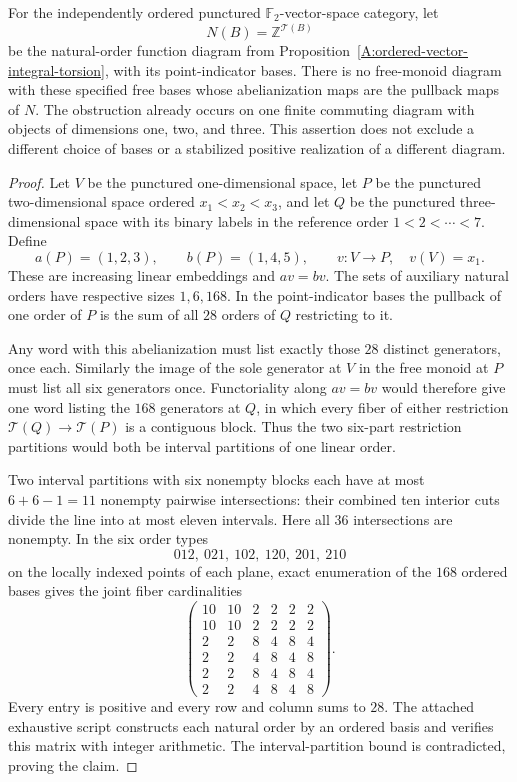 \begin{proposition}
\label{G:natural-order-fiber-obstruction}
For the independently ordered punctured $\mathbb F_2$-vector-space
category, let
\[
 N(B)=\mathbb Z^{\mathcal T(B)}
\]
be the natural-order function diagram from
Proposition~\ref{A:ordered-vector-integral-torsion}, with its
point-indicator bases. There is no free-monoid diagram with these
specified free bases whose abelianization maps are the pullback
maps of $N$. The obstruction already occurs on one finite
commuting diagram with objects of dimensions one, two, and three.
This assertion does not exclude a different choice of bases or a
stabilized positive realization of a different diagram.
\end{proposition}
\begin{proof}
Let $V$ be the punctured one-dimensional space, let $P$ be the
punctured two-dimensional space ordered $x_1<x_2<x_3$, and let
$Q$ be the punctured three-dimensional space with its binary labels
in the reference order $1<2<\cdots<7$. Define
\[
 a(P)=(1,2,3),\qquad b(P)=(1,4,5),
 \qquad v:V\to P,\quad v(V)=x_1.
\]
These are increasing linear embeddings and $av=bv$. The sets
of auxiliary natural orders have respective sizes $1,6,168$.
In the point-indicator bases the pullback of one order of $P$ is
the sum of all $28$ orders of $Q$ restricting to it.

Any word with this abelianization must list exactly those $28$
distinct generators, once each. Similarly the image of the sole
generator at $V$ in the free monoid at $P$ must list all six
generators once. Functoriality along $av=bv$ would therefore give
one word listing the $168$ generators at $Q$, in which every fiber
of either restriction $\mathcal T(Q)\to\mathcal T(P)$ is a
contiguous block. Thus the two six-part restriction partitions
would both be interval partitions of one linear order.

Two interval partitions with six nonempty blocks each have at
most $6+6-1=11$ nonempty pairwise intersections: their combined
ten interior cuts divide the line into at most eleven intervals.
Here all $36$ intersections are nonempty. In the six order types
\[
 012,\ 021,\ 102,\ 120,\ 201,\ 210
\]
on the locally indexed points of each plane, exact enumeration of
the $168$ ordered bases gives the joint fiber cardinalities
\[
 \begin{pmatrix}
 10&10&2&2&2&2\\
 10&10&2&2&2&2\\
 2&2&8&4&8&4\\
 2&2&4&8&4&8\\
 2&2&8&4&8&4\\
 2&2&4&8&4&8
 \end{pmatrix}.
\]
Every entry is positive and every row and column sums to $28$.
The attached exhaustive script constructs each natural order by
an ordered basis and verifies this matrix with integer arithmetic.
The interval-partition bound is contradicted, proving the claim.
\end{proof}
